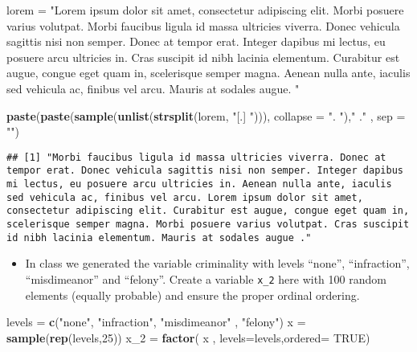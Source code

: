 \documentclass[]{article}
\newenvironment{Shaded}{\begin{snugshade}}{\end{snugshade}}
\newcommand{\KeywordTok}[1]{\textcolor[rgb]{0.13,0.29,0.53}{\textbf{#1}}}
\newcommand{\DataTypeTok}[1]{\textcolor[rgb]{0.13,0.29,0.53}{#1}}
\newcommand{\DecValTok}[1]{\textcolor[rgb]{0.00,0.00,0.81}{#1}}
\newcommand{\StringTok}[1]{\textcolor[rgb]{0.31,0.60,0.02}{#1}}
\newcommand{\OtherTok}[1]{\textcolor[rgb]{0.56,0.35,0.01}{#1}}
\newcommand{\NormalTok}[1]{#1}
\providecommand{\tightlist}{%
  \setlength{\itemsep}{0pt}\setlength{\parskip}{0pt}}
\begin{document}
\begin{Shaded}
\begin{Highlighting}[]
\NormalTok{lorem =}\StringTok{ "Lorem ipsum dolor sit amet, consectetur adipiscing elit. Morbi posuere varius volutpat. Morbi faucibus ligula id massa ultricies viverra. Donec vehicula sagittis nisi non semper. Donec at tempor erat. Integer dapibus mi lectus, eu posuere arcu ultricies in. Cras suscipit id nibh lacinia elementum. Curabitur est augue, congue eget quam in, scelerisque semper magna. Aenean nulla ante, iaculis sed vehicula ac, finibus vel arcu. Mauris at sodales augue. "}

\KeywordTok{paste}\NormalTok{(}\KeywordTok{paste}\NormalTok{(}\KeywordTok{sample}\NormalTok{(}\KeywordTok{unlist}\NormalTok{(}\KeywordTok{strsplit}\NormalTok{(lorem, }\StringTok{"[.] "}\NormalTok{))), }\DataTypeTok{collapse =} \StringTok{". "}\NormalTok{),}\StringTok{" ."}\NormalTok{ , }\DataTypeTok{sep =} \StringTok{""}\NormalTok{) }
\end{Highlighting}
\end{Shaded}

\begin{verbatim}
## [1] "Morbi faucibus ligula id massa ultricies viverra. Donec at tempor erat. Donec vehicula sagittis nisi non semper. Integer dapibus mi lectus, eu posuere arcu ultricies in. Aenean nulla ante, iaculis sed vehicula ac, finibus vel arcu. Lorem ipsum dolor sit amet, consectetur adipiscing elit. Curabitur est augue, congue eget quam in, scelerisque semper magna. Morbi posuere varius volutpat. Cras suscipit id nibh lacinia elementum. Mauris at sodales augue ."
\end{verbatim}

\begin{itemize}
\tightlist
\item
  In class we generated the variable criminality with levels ``none'',
  ``infraction'', ``misdimeanor'' and ``felony''. Create a variable
  \texttt{x\_2} here with 100 random elements (equally probable) and
  ensure the proper ordinal ordering.
\end{itemize}

\begin{Shaded}
\begin{Highlighting}[]
\NormalTok{levels =}\StringTok{ }\KeywordTok{c}\NormalTok{(}\StringTok{"none"}\NormalTok{, }\StringTok{"infraction"}\NormalTok{, }\StringTok{"misdimeanor"}\NormalTok{ , }\StringTok{"felony"}\NormalTok{)}
\NormalTok{x =}\StringTok{  }\KeywordTok{sample}\NormalTok{(}\KeywordTok{rep}\NormalTok{(levels,}\DecValTok{25}\NormalTok{))}
\NormalTok{x_}\DecValTok{2}\NormalTok{ =}\StringTok{ }\KeywordTok{factor}\NormalTok{( x , }\DataTypeTok{levels=}\NormalTok{levels,}\DataTypeTok{ordered=} \OtherTok{TRUE}\NormalTok{)}
\end{Highlighting}
\end{Shaded}
\end{document}
